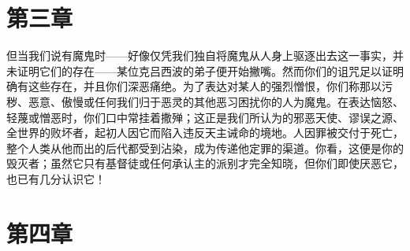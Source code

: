 
\section{第三章}

但当我们说有魔鬼时——好像仅凭我们独自将魔鬼从人身上驱逐出去这一事实，并未证明它们的存在——某位克吕西波的弟子便开始撇嘴。然而你们的诅咒足以证明确有这些存在，并且你们深恶痛绝。为了表达对某人的强烈憎恨，你们称那以污秽、恶意、傲慢或任何我们归于恶灵的其他恶习困扰你的人为魔鬼。在表达恼怒、轻蔑或憎恶时，你们口中常挂着撒殚；这正是我们所认为的邪恶天使、谬误之源、全世界的败坏者，起初人因它而陷入违反天主诫命的境地。人因罪被交付于死亡，整个人类从他而出的后代都受到沾染，成为传递他定罪的渠道。你看，这便是你的毁灭者；虽然它只有基督徒或任何承认主的派别才完全知晓，但你们即使厌恶它，也已有几分认识它！\par


\section{第四章}

